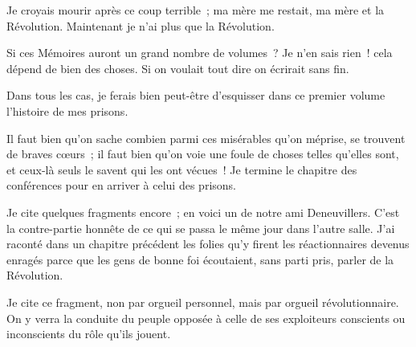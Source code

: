 \documentclass[french,twoside]{book} %
\begin{document}
\noindent Je croyais mourir après ce coup terrible ; ma mère me restait, ma mère et la Révolution. Maintenant je n’ai plus que la Révolution.\par
\bigbreak
\noindent Si ces Mémoires auront un grand nombre de volumes ? Je n’en sais rien ! cela dépend de bien des choses. Si on voulait tout dire on écrirait sans fin.\par
 Dans tous les cas, je ferais bien peut-être d’esquisser dans ce premier volume l’histoire de mes prisons.\par
Il faut bien qu’on sache combien parmi ces misérables qu’on méprise, se trouvent de braves cœurs ; il faut bien qu’on voie une foule de choses telles qu’elles sont, et ceux-là seuls le savent qui les ont vécues ! Je termine le chapitre des conférences pour en arriver à celui des prisons.\par
Je cite quelques fragments encore ; en voici un de notre ami Deneuvillers. C’est la contre-partie honnête de ce qui se passa le même jour dans l’autre salle. J’ai raconté dans un chapitre précédent les folies qu’y firent les réactionnaires devenus enragés parce que les gens de bonne foi écoutaient, sans parti pris, parler de la Révolution.\par
Je cite ce fragment, non par orgueil personnel, mais par orgueil révolutionnaire. On y verra la conduite du peuple opposée à celle de ses exploiteurs conscients ou inconscients du rôle qu’ils jouent.\par
\end{document}
